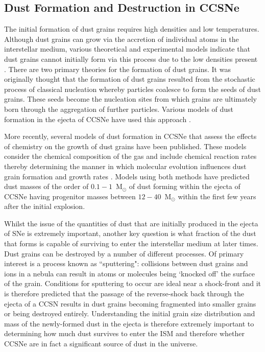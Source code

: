 \subsection{Dust Formation and Destruction in CCSNe}
\label{scn:dust_formation}

The initial formation of dust grains requires high densities and low temperatures.  Although dust grains can grow via the accretion of individual atoms in the interstellar medium, various theoretical and experimental models indicate that dust grains cannot initially form via this process due to the low densities present \citep{Osterbrock2006}.  There are two primary theories for the formation of dust grains.  It was originally thought that the formation of dust grains resulted from the stochastic process of classical nucleation whereby particles coalesce to form the seeds of dust grains.  These seeds become the nucleation sites from which grains are ultimately born through the aggregation of further particles.  Various models of dust formation in the ejecta of CCSNe have used this approach \citep{Kozasa1989, Todini2001,Nozawa2003, Schneider2004}.  

More recently, several models of dust formation in CCSNe that assess the effects of chemistry on the growth of dust grains have been published.   These models consider the chemical composition of the gas and include chemical reaction rates thereby determining the manner in which molecular evolution influences dust grain formation and growth rates \citep{Cherchneff2009, Cherchneff2010, Sarangi2013, Sarangi2015}.  Models using both methods have predicted dust masses of the order of $0.1-1$~M$_{\odot}$ of dust forming within the ejecta of CCSNe having progenitor masses between $12-40$~M$_{\odot}$ within the first few years after the initial explosion.  

Whilst the issue of the quantities of dust that are initially produced in the ejecta of SNe is extremely important, another key question is what fraction of the dust that forms is capable of surviving to enter the interstellar medium at later times. Dust grains can be destroyed by a number of different processes.  Of primary interest is a process known as ``sputtering": collisions between dust grains and ions in a nebula can result in atoms or molecules being `knocked off' the surface of the grain.  Conditions for sputtering to occur are ideal near a shock-front \citep{Barlow1977,Barlow1978} and it is therefore predicted that the passage of the reverse-shock back through the ejecta of a CCSN results in dust grains becoming fragmented into smaller grains or being destroyed entirely.  Understanding the initial grain size distribution and mass of the newly-formed dust in the ejecta is therefore extremely important to determining how much dust survives to enter the ISM and therefore whether CCSNe are in fact a significant source of dust in the universe.

